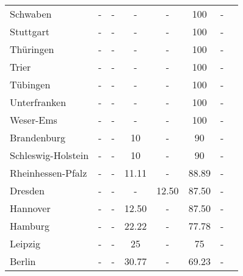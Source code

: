 \begin{table}[H]
\begin{tabularx}{\textwidth}{Xccccccc}
            Schwaben & - & - & - & - & 100 & - \\
            Stuttgart & - & - & - & - & 100 & - \\
            Thüringen & - & - & - & - & 100 & - \\
            Trier & - & - & - & - & 100 & - \\
            Tübingen & - & - & - & - & 100 & - \\
            Unterfranken & - & - & - & - & 100 & - \\
            Weser-Ems & - & - & - & - & 100 & - \\
            Brandenburg & - & - & 10 & - & 90 & - \\
            Schleswig-Holstein & - & - & 10 & - & 90 & - \\
            Rheinhessen-Pfalz & - & - & 11.11 & - & 88.89 & - \\
            Dresden & - & - & - & 12.50 & 87.50 & - \\
            Hannover & - & - & 12.50 & - & 87.50 & - \\
            Hamburg & - & - & 22.22 & - & 77.78 & - \\
            Leipzig & - & - & 25 & - & 75 & - \\
            Berlin & - & - & 30.77 & - & 69.23 & - \\
        \bottomrule
    \end{tabularx}
\end{table}
    